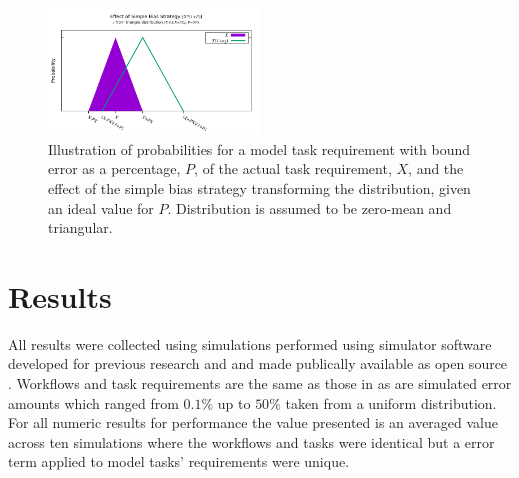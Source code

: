 \documentclass[10pt]{csce}
\begin{document}
\begin{figure}
	\begin{center}
		\includegraphics[width=0.5\textwidth]{figures/BiasVisualization_Simple.pdf}
	\end{center}
	\caption{Illustration of probabilities for a model task requirement
		with bound error as a percentage, $P$, of the actual task
		requirement, $X$, and the effect of the simple bias strategy
		transforming the distribution, given an ideal value for $P$.
		Distribution is assumed to be zero-mean and triangular.}
	\label{fig:sbias}
\end{figure}

\section{Results}
\label{sec:Results}

All results were collected using simulations performed using simulator software
developed for previous research \cite{costmin} and \cite{pdpta18} and made
publically available as open source \cite{soasim}.  Workflows and task
requirements are the same as those in \cite{pdpta18} as are simulated error
amounts which ranged from $0.1\%$ up to $50\%$ taken from a uniform
distribution.  For all numeric results for performance the value presented is
an averaged value across ten simulations where the workflows and tasks were
identical but a error term applied to model tasks' requirements were unique.
\end{document}
